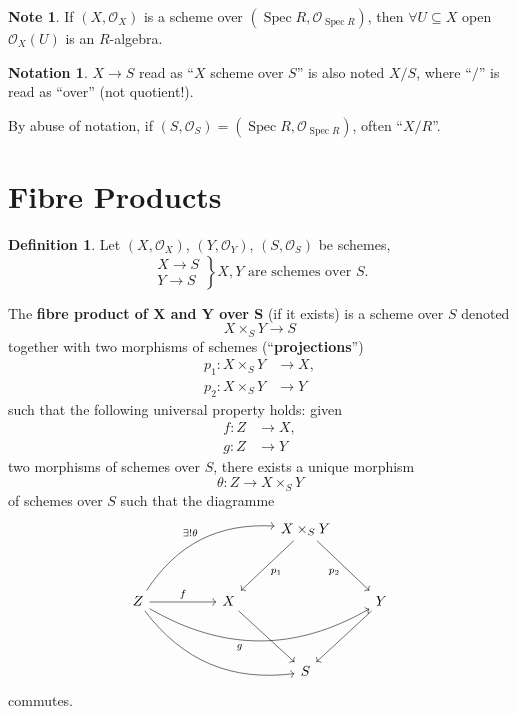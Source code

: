 \documentclass[12pt]{article}
\DeclareMathOperator{\Spec}{Spec}
\theoremstyle{definition}
\newtheorem*{definition}{Definition}
\newtheorem*{notation}{Notation}
\newtheorem*{note}{Note}
\begin{document}
\begin{note}
If $(X,\mathcal O_X)$ is a scheme over $(\Spec R,\mathcal O_{\Spec R})$, then $\forall U\subseteq X$ open $\mathcal O_X(U)$ is an $R$-algebra.
\end{note}

\begin{notation}
$X\rightarrow S$ read as ``$X$ scheme over $S$'' is also noted $X/S$, where ``$/$'' is read as ``over'' (not quotient!).

By abuse of notation, if $(S,\mathcal O_S)=(\Spec R,\mathcal O_{\Spec R})$, often ``$X/R$''.
\end{notation}

\section{Fibre Products}

\begin{definition}
Let $(X,\mathcal O_X)$, $(Y,\mathcal O_Y)$, $(S,\mathcal O_S)$ be schemes,
\[\left.\begin{array}{l}X\rightarrow S\\Y\rightarrow S\end{array}\right\}X,Y\text{ are schemes over }S.\]

The \textbf{fibre product of $\boldsymbol X$ and $\boldsymbol Y$ over S} (if it exists) is a scheme over $S$ denoted
\[X\times_SY\longrightarrow S\]
together with two morphisms of schemes (``\textbf{projections}'')
\begin{align*}
p_1:X\times_SY&\longrightarrow X,\\p_2:X\times_SY&\longrightarrow Y
\end{align*}
such that the following universal property holds: given
\begin{align*}
f:Z&\longrightarrow X,\\g:Z&\longrightarrow Y
\end{align*}
two morphisms of schemes over $S$, there exists a unique morphism
\[\theta:Z\longrightarrow X\times_SY\]
of schemes over $S$ such that the diagramme
\[\begin{tikzcd}&&&X\times_SY\arrow[ddl,"p_1"]\arrow[ddr,"p_2",swap]\\\\Z\arrow[rr,"f"]\arrow[rrruu,bend left,"\exists!\theta"]\arrow[rrrr,bend right,"g\hspace{10mm}",swap]\arrow[rrrdd,bend right]&&X\arrow[rdd]&&Y\arrow[ldd]\\\\&&&S\end{tikzcd}\]
commutes.
\end{definition}
\end{document}
